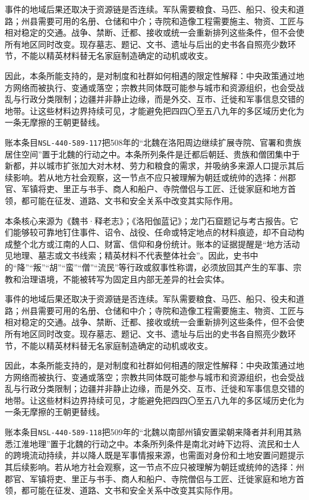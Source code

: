 事件的地域后果还取决于资源链是否连续。军队需要粮食、马匹、船只、役夫和道路；州县需要可用的名册、仓储和中介；寺院和造像工程需要施主、物资、工匠与相对稳定的交通。战争、禁断、迁都、接收或统一会重新排列这些条件，但不会使所有地区同时改变。现存墓志、题记、文书、遗址与后出的史书各自照亮少数环节，不能以精英材料替无名家庭制造确定的动机或收支。

因此，本条所能支持的，是对制度和社群如何相遇的限定性解释：中央政策通过地方网络而被执行、变通或落空；宗教共同体既可能参与城市和资源组织，也会受战乱与行政分类限制；边疆并非静止边缘，而是外交、互市、迁徙和军事信息交错的地带。让这些材料边界持续可见，才能避免把四四〇至五八九年的多区域历史化为一条无摩擦的王朝更替线。

账本条目\texttt{NSL-440-589-117}把508年的“北魏在洛阳周边继续扩展寺院、官署和贵族居住空间”置于北魏的行动之中。本条所列条件是迁都后朝廷、贵族和僧团集中于新都，并以城市扩张加大对木材、劳力和粮食的需求，并吸纳多来源人口提示其后续影响。若从地方社会观察，这一节点不应只被理解为朝廷或统帅的选择：州郡官、军镇将吏、里正与书手、商人和船户、寺院僧侣与工匠、迁徙家庭和地方首领，都可能在征发、道路、文书和安全关系中改变其实际作用。

本条核心来源为《魏书·释老志》；《洛阳伽蓝记》；龙门石窟题记与考古报告。它们能够较可靠地钉住事件、诏令、战役、任命或特定地点的材料痕迹，却不自动构成整个北方或江南的人口、财富、信仰和身份统计。账本的证据提醒是“地方活动见地理、墓志或文书线索；精英材料不代表整体社会”。因此，史书中的“降”“叛”“胡”“蛮”“僧”“流民”等行政或叙事性称谓，必须放回其产生的军事、宗教和治理语境，不能被转写为固定且内部无差异的社会实体。

事件的地域后果还取决于资源链是否连续。军队需要粮食、马匹、船只、役夫和道路；州县需要可用的名册、仓储和中介；寺院和造像工程需要施主、物资、工匠与相对稳定的交通。战争、禁断、迁都、接收或统一会重新排列这些条件，但不会使所有地区同时改变。现存墓志、题记、文书、遗址与后出的史书各自照亮少数环节，不能以精英材料替无名家庭制造确定的动机或收支。

因此，本条所能支持的，是对制度和社群如何相遇的限定性解释：中央政策通过地方网络而被执行、变通或落空；宗教共同体既可能参与城市和资源组织，也会受战乱与行政分类限制；边疆并非静止边缘，而是外交、互市、迁徙和军事信息交错的地带。让这些材料边界持续可见，才能避免把四四〇至五八九年的多区域历史化为一条无摩擦的王朝更替线。

账本条目\texttt{NSL-440-589-118}把509年的“北魏以南部州镇安置梁朝来降者并利用其熟悉江淮地理”置于北魏的行动之中。本条所列条件是南北对峙下边将、流民和士人的跨境流动持续，并以降人既是军事情报来源，也需面对身份和土地安置问题提示其后续影响。若从地方社会观察，这一节点不应只被理解为朝廷或统帅的选择：州郡官、军镇将吏、里正与书手、商人和船户、寺院僧侣与工匠、迁徙家庭和地方首领，都可能在征发、道路、文书和安全关系中改变其实际作用。

